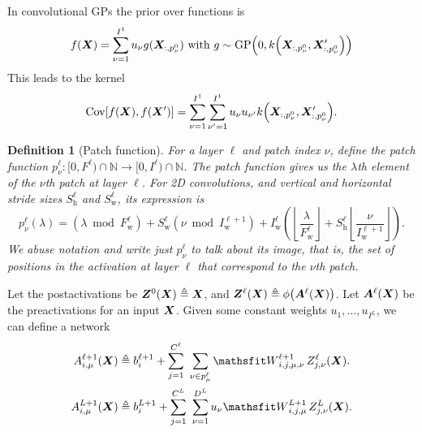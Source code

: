 \documentclass{article} %
\newcommand{\bracket}[3]{{\left#1 #3 \right#2}}
\newcommand{\bra}{\bracket{(}{)}}
\newcommand{\sqb}{\bracket{[}{]}}
\newcommand{\floor}{\bracket{\lfloor}{\rfloor}}
\newcommand{\ssup}[1]{^{#1}}
\newcommand{\GP}[1]{{\text{GP}\bra{#1}}}
\newcommand{\eqdef}{\triangleq}
\newcommand{\patch}[2]{{p\ssup{#1}_{#2}}}
\newcommand{\p}[2]{{\patch{\ell #1}{\nu #2}\bra{\lambda}}}
\newcommand{\Iw}[1]{{I\ssup{#1}_\text{w}}}
\newcommand{\Iwl}[1]{\Iw{\ell #1}}
\newcommand{\Sw}[1]{{S\ssup{#1}_\text{w}}}
\newcommand{\Swl}[1]{\Sw{\ell #1}}
\newcommand{\Sh}[1]{{S\ssup{#1}_\text{h}}}
\newcommand{\Shl}[1]{\Sh{\ell #1}}
\newcommand{\Fw}[1]{{F\ssup{#1}_\text{w}}}
\newcommand{\Fwl}[1]{\Fw{\ell #1}}
\newtheorem{definition}[theorem]{Definition}
\begin{document}
In convolutional GPs \citep{markvdw2017convolutional} the prior over functions is
\begin{equation}
  f(\mX) = \sum_{\nu=1}^{I\ssup{1}} \evu_\nu g(\mX_{:, p\ssup{0}_\nu}) \text{ with } g \sim \GP{0, k\bra{\mX_{:, p\ssup{0}_\nu}, \mX'_{:, p\ssup{0}_\nu}}}
\end{equation}
This leads to the kernel 
\begin{equation}
  \Cov\sqb{f(\mX), f(\mX')} = \sum_{\nu=1}^{I\ssup{1}}\sum_{\nu'=1}^{I\ssup{1}} \evu_{\nu} \evu_{\nu'} k\bra{\mX_{:, p\ssup{0}_\nu}, \mX'_{:, p\ssup{0}_\nu}}.
\end{equation}

\begin{definition}[Patch function]
  For a layer $\ell$ and patch index $\nu$, define the patch function $p\ssup{\ell}_\nu: [0, F\ssup{\ell})
  \cap \mathbb{N} \to [0, I\ssup{\ell}) \cap \mathbb{N}$.
  The patch function gives us the $\lambda$th element of the $\nu$th patch at layer
  $\ell$. For 2D convolutions, and vertical and horizontal stride sizes $\Shl{}$ and $\Swl{}$,
  its expression is
  \begin{equation}
    \p{}{}{}
    = \bra{\lambda \bmod \Fwl{}} + \Swl{}\bra{\nu\bmod \Iwl{+1}}
    + \Iwl{}\bra{\floor{\frac{\lambda}{\Fwl{}}} + \Shl{} \floor{\frac{\nu}{\Iwl{+1}}}}.
  \end{equation}
  We abuse notation and write just $p\ssup{\ell}_\nu$ to talk about its image, that is,
  the set of positions in the activation at layer $\ell$ that correspond to the $\nu$th patch.
  \label{def:patch-function}
\end{definition}



Let the postactivations be $\mZ\ssup{0}(\mX) \eqdef \mX$, and
$\mZ\ssup{\ell}(\mX) \eqdef \phi\bra{\mA\ssup{\ell}(\mX)}$. Let
$\mA\ssup{\ell}(\mX)$ be the preactivations for an input ${\bm{X}}$. Given some
constant weights ${u_1, \dots, u_{I\ssup{L}}}$, we can define a network
\begin{align}
  \emA_{i,\mu}\ssup{\ell+1}(\mX) &\eqdef \evb_i\ssup{\ell+1} +
  \sum_{j=1}^{C\ssup{\ell}} \ \sum_{\nu\in\patch{\ell}{\mu}} \etW\ssup{\ell+1}_{i,j,\mu,\nu}\, \emZ\ssup{\ell}_{j,\nu}(\mX).
  \label{eq:convgp-network-recursive} \\
  \emA_{i,\mu}\ssup{L+1}(\mX) &\eqdef \evb_i\ssup{L+1} +
                                   \sum_{j=1}^{C\ssup{L}} \ \sum_{\nu=1}^{D\ssup{L}} u_\nu \etW\ssup{L+1}_{i,j,\mu}\, \emZ\ssup{L}_{j,\nu}(\mX).
                                   \label{eq:convgp-network-final}
\end{align}
\end{document}
